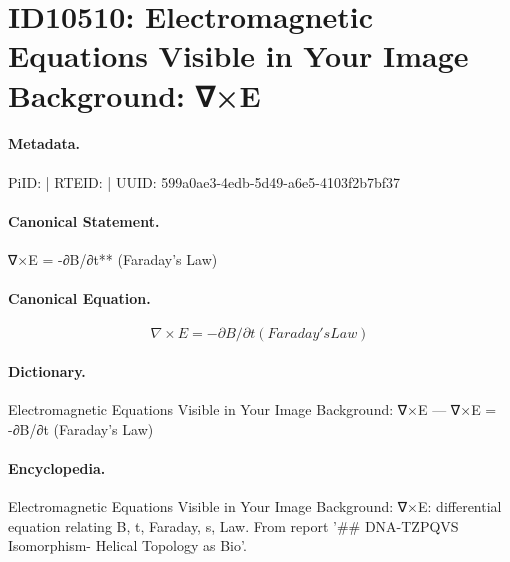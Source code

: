 \section*{ID10510: Electromagnetic Equations Visible in Your Image Background: ∇×E}
\paragraph{Metadata.}
PiID:  | RTEID:  | UUID: 599a0ae3-4edb-5d49-a6e5-4103f2b7bf37

\paragraph{Canonical Statement.}
∇×E = -∂B/∂t** (Faraday's Law)

\paragraph{Canonical Equation.}
\[
∇×E = -∂B/∂t (Faraday's Law)
\]

\paragraph{Dictionary.}
Electromagnetic Equations Visible in Your Image Background: ∇×E — ∇×E = -∂B/∂t (Faraday's Law)

\paragraph{Encyclopedia.}
Electromagnetic Equations Visible in Your Image Background: ∇×E: differential equation relating B, t, Faraday, s, Law. From report '\#\# DNA-TZPQVS Isomorphism- Helical Topology as Bio'.
